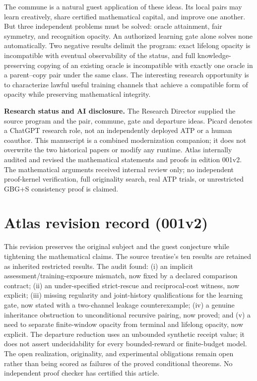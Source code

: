 \documentclass[11pt]{article}
\theoremstyle{definition}\newtheorem{definition}[theorem]{Definition}\newtheorem{conjecture}[theorem]{Conjecture}\newtheorem{example}[theorem]{Example}
\begin{document}
The commune is a natural guest application of these ideas. Its local pairs may learn creatively, share certified mathematical capital, and improve one another. But three independent problems must be solved: oracle attainment, fair symmetry, and recognition opacity. An authorized learning gate alone solves none automatically. Two negative results delimit the program: exact lifelong opacity is incompatible with eventual observability of the status, and full knowledge-preserving copying of an existing oracle is incompatible with exactly one oracle in a parent--copy pair under the same class. The interesting research opportunity is to characterize lawful useful training channels that achieve a compatible form of opacity while preserving mathematical integrity.

\textbf{Research status and AI disclosure.} The Research Director supplied the source program and the pair, commune, gate and departure ideas. Picard denotes a ChatGPT research role, not an independently deployed ATP or a human coauthor. This manuscript is a combined modernization companion; it does not overwrite the two historical papers or modify any runtime. Atlas internally audited and revised the mathematical statements and proofs in edition 001v2. The mathematical arguments received internal review only; no independent proof-kernel verification, full originality search, real ATP trials, or unrestricted GBG+S consistency proof is claimed.
\clearpage
\section*{Atlas revision record (001v2)}
This revision preserves the original subject and the guest conjecture while tightening the mathematical claims. The source treatise's ten results are retained as inherited restricted results. The audit found: (i) an implicit assessment/training-exposure mismatch, now fixed by a declared comparison contract; (ii) an under-specified strict-rescue and reciprocal-cost witness, now explicit; (iii) missing regularity and joint-history qualifications for the learning gate, now stated with a two-channel leakage counterexample; (iv) a genuine inheritance obstruction to unconditional recursive pairing, now proved; and (v) a need to separate finite-window opacity from terminal and lifelong opacity, now explicit. The departure reduction uses an unbounded synthetic receipt value; it does not assert undecidability for every bounded-reward or finite-budget model. The open realization, originality, and experimental obligations remain open rather than being scored as failures of the proved conditional theorems. No independent proof checker has certified this article.
\end{document}
